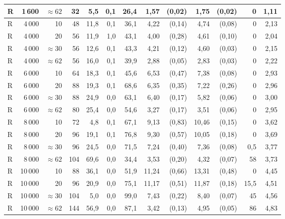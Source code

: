 \begin{landscape}
{\begin{longtable}{@{}l r r r  r r r  r r  r r  r r@{}}
R & 1\,600 & ${\approx}62$ &  32 &  5{,}5 & 0{,}1 &  26{,}4 &  1{,}57 & (0{,}02) &  1{,}75 & (0{,}02) &      0 & 1{,}11 \\
\midrule
R & 4\,000 & 10           &  48 & 11{,}8 & 0{,}1 &  36{,}1 &  4{,}22 & (0{,}14) &  4{,}74 & (0{,}08) &      0 & 2{,}13 \\
R & 4\,000 & 20           &  56 & 11{,}9 & 1{,}0 &  43{,}1 &  4{,}00 & (0{,}28) &  4{,}61 & (0{,}10) &      0 & 2{,}04 \\
R & 4\,000 & ${\approx}30$ &  56 & 12{,}6 & 0{,}1 &  43{,}3 &  4{,}21 & (0{,}12) &  4{,}60 & (0{,}03) &      0 & 2{,}15 \\
R & 4\,000 & ${\approx}62$ &  56 & 16{,}0 & 0{,}1 &  39{,}9 &  2{,}88 & (0{,}05) &  2{,}83 & (0{,}03) &      0 & 2{,}22 \\
\midrule
R & 6\,000 & 10           &  64 & 18{,}3 & 0{,}1 &  45{,}6 &  6{,}53 & (0{,}47) &  7{,}38 & (0{,}08) &      0 & 2{,}93 \\
R & 6\,000 & 20           &  88 & 19{,}3 & 0{,}1 &  68{,}6 &  6{,}35 & (0{,}35) &  7{,}22 & (0{,}26) &      0 & 2{,}96 \\
R & 6\,000 & ${\approx}30$ &  88 & 24{,}9 & 0{,}0 &  63{,}1 &  6{,}40 & (0{,}17) &  5{,}82 & (0{,}06) &      0 & 3{,}00 \\
R & 6\,000 & ${\approx}62$ &  80 & 25{,}4 & 0{,}0 &  54{,}6 &  3{,}27 & (0{,}17) &  3{,}51 & (0{,}06) &      0 & 2{,}95 \\
\midrule
R & 8\,000 & 10           &  72 &  4{,}8 & 0{,}1 &  67{,}1 &  9{,}13 & (0{,}83) & 10{,}46 & (0{,}15) &      0 & 3{,}62 \\
R & 8\,000 & 20           &  96 & 19{,}1 & 0{,}1 &  76{,}8 &  9{,}30 & (0{,}57) & 10{,}05 & (0{,}18) &      0 & 3{,}69 \\
R & 8\,000 & ${\approx}30$ &  96 & 24{,}5 & 0{,}0 &  71{,}5 &  7{,}24 & (0{,}40) &  7{,}36 & (0{,}08) &  0{,}5 & 3{,}77 \\
R & 8\,000 & ${\approx}62$ & 104 & 69{,}6 & 0{,}0 &  34{,}4 &  3{,}53 & (0{,}20) &  4{,}32 & (0{,}07) &     58 & 3{,}73 \\
\midrule
R & 10\,000 & 10           &  88 & 36{,}1 & 0{,}0 &  51{,}9 & 11{,}24 & (0{,}66) & 13{,}31 & (0{,}48) &      0 & 4{,}45 \\
R & 10\,000 & 20           &  96 & 20{,}9 & 0{,}0 &  75{,}1 & 11{,}17 & (0{,}51) & 11{,}87 & (0{,}18) & 15{,}5 & 4{,}51 \\
R & 10\,000 & ${\approx}30$ & 104 &  5{,}0 & 0{,}0 &  99{,}0 &  7{,}43 & (0{,}22) &  8{,}40 & (0{,}07) &     45 & 4{,}56 \\
R & 10\,000 & ${\approx}62$ & 144 & 56{,}9 & 0{,}0 &  87{,}1 &  3{,}42 & (0{,}13) &  4{,}95 & (0{,}05) &     86 & 4{,}83 \\


\end{longtable}}
\end{landscape}

